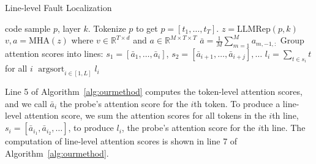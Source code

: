 \begin{algorithm}[tb]
   \caption{\ourmethod{} Line-level Fault Localization}
   \label{alg:ourmethod}
\begin{algorithmic}[1]
    code sample $p$, layer $k$.
   \STATE Tokenize $p$ to get $p=[t_1,\dots, t_T]$.
   \STATE $z = \text{LLMRep}(p, k)$
   \STATE $v, a = \text{MHA}(z)$ where $v\in \mathbb{R}^{T\times d}$ and $a\in\mathbb{R}^{M\times T\times T}$
   \STATE $\bar{a} = \frac{1}{M}\sum_{m=1}^M a_{m,-1,:}$ 
   \STATE Group attention scores into lines: $s_1 = [\bar{a}_1, \dots, \bar{a}_i]$, $s_2 = [\bar{a}_{i+1}, \dots, \bar{a}_{i+j}], \dots$
   \STATE $l_i = \sum_{t\in s_i} t$ for all $i$ 
    $\operatorname{argsort}_{i\in[1,L]} l_i $
\end{algorithmic}
\end{algorithm}



Line 5 of Algorithm~\ref{alg:ourmethod} computes the token-level attention scores, and we call $\bar{a}_i$ the probe's attention score for the $i$th token.
To produce a line-level attention score, we sum the attention scores for all tokens in the $i$th line, $s_i = [\bar{a}_{i_1}, \bar{a}_{i_2}, \dots ]$, to produce $l_i$, the probe's attention score for the $i$th line. The computation of line-level attention scores is shown in line 7 of Algorithm~\ref{alg:ourmethod}.

